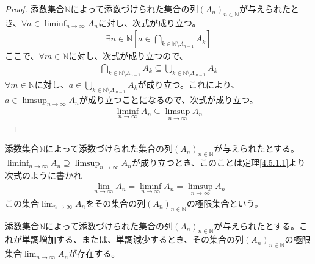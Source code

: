 \documentclass[dvipdfmx]{jsarticle}
\begin{document}
\begin{proof}
添数集合$\mathbb{N}$によって添数づけられた集合の列$\left( A_{n} \right)_{n \in \mathbb{N}}$が与えられたとき、$\forall a \in \liminf_{n \rightarrow \infty}A_{n}$に対し、次式が成り立つ。
\begin{align*}
\exists n \in \mathbb{N}\left[ a \in \bigcap_{k \in \mathbb{N} \setminus \varLambda_{n - 1}} A_{k} \right]
\end{align*}
ここで、$\forall m \in \mathbb{N}$に対し、次式が成り立つので、
\begin{align*}
\bigcap_{k \in \mathbb{N} \setminus \varLambda_{n - 1}} A_{k} \subseteq \bigcup_{k \in \mathbb{N} \setminus \varLambda_{m - 1}} A_{k}
\end{align*}
$\forall m \in \mathbb{N}$に対し、$a \in \bigcup_{k \in \mathbb{N} \setminus \varLambda_{m - 1}} A_{k}$が成り立つ。これにより、$a \in \limsup_{n \rightarrow \infty}A_{n}$が成り立つことになるので、次式が成り立つ。
\begin{align*}
\liminf_{n \rightarrow \infty}A_{n} \subseteq \limsup_{n \rightarrow \infty}A_{n}
\end{align*}
\end{proof}
\begin{dfn}
添数集合$\mathbb{N}$によって添数づけられた集合の列$\left( A_{n} \right)_{n \in \mathbb{N}}$が与えられたとする。$\liminf_{n \rightarrow \infty}A_{n} \supseteq \limsup_{n \rightarrow \infty}A_{n}$が成り立つとき、このことは定理\ref{4.5.1.1}より次式のように書かれ
\begin{align*}
\lim_{n \rightarrow \infty}A_{n} = \liminf_{n \rightarrow \infty}A_{n} = \limsup_{n \rightarrow \infty}A_{n}
\end{align*}
この集合$\lim_{n \rightarrow \infty}A_{n}$をその集合の列$\left( A_{n} \right)_{n \in \mathbb{N}}$の極限集合という。
\end{dfn}
\begin{thm}\label{4.5.1.2}
添数集合$\mathbb{N}$によって添数づけられた集合の列$\left( A_{n} \right)_{n \in \mathbb{N}}$が与えられたとする。これが単調増加する、または、単調減少するとき、その集合の列$\left( A_{n} \right)_{n \in \mathbb{N}}$の極限集合$\lim_{n \rightarrow \infty}A_{n}$が存在する。
\end{thm}
\end{document}

